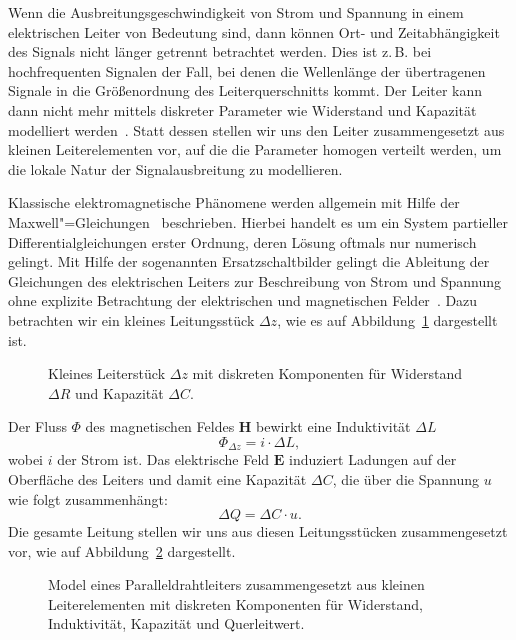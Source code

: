 \documentclass[paper=a4, parskip=half-, ngerman, fontsize=11pt]{scrreprt}
\begin{document}
Wenn die Ausbreitungsgeschwindigkeit von Strom und Spannung in einem elektrischen Leiter von Bedeutung sind, dann
können Ort- und Zeitabhängigkeit des Signals nicht länger getrennt betrachtet werden. Dies ist z.\,B. bei
hochfrequenten Signalen der Fall, bei denen die Wellenlänge der übertragenen Signale in die Größenordnung des
Leiterquerschnitts kommt. Der Leiter kann dann nicht mehr mittels diskreter Parameter wie Widerstand und Kapazität
modelliert werden~\cite{LeiterTheorie}. Statt dessen stellen wir uns den Leiter zusammengesetzt aus kleinen
Leiterelementen vor, auf die die Parameter homogen verteilt werden, um die lokale Natur der Signalausbreitung zu
modellieren.

Klassische elektromagnetische Phänomene werden allgemein mit Hilfe der Maxwell"=Gleichungen~\cite{MaxwellGleichungen}
beschrieben. Hierbei handelt es um ein System partieller Differentialgleichungen erster Ordnung, deren Lösung oftmals
nur numerisch gelingt. Mit Hilfe der sogenannten Ersatzschaltbilder gelingt die Ableitung der Gleichungen des
elektrischen Leiters zur Beschreibung von Strom und Spannung ohne explizite Betrachtung der elektrischen und
magnetischen Felder~\cite{LeitungenUndFilter}. Dazu betrachten wir ein kleines Leitungsstück $\Delta z$, wie es auf
Abbildung~\ref{Leitung1} dargestellt ist.
\begin{figure}[!htb]
    \begin{center}
        
        \caption{Kleines Leiterstück $\Delta z$ mit diskreten Komponenten für Widerstand $\Delta R$ und
        Kapazität $\Delta C$.}
        \label{Leitung1}
    \end{center}
\end{figure}

Der Fluss $\Phi$ des magnetischen Feldes $\textbf{H}$ bewirkt eine Induktivität $\Delta L$
\[ \Phi_{\Delta z} = i \cdot \Delta L, \] wobei $i$ der Strom ist.
Das elektrische Feld $\textbf{E}$ induziert Ladungen auf der Oberfläche des Leiters und damit eine Kapazität $\Delta C$,
die über die Spannung $u$ wie folgt zusammenhängt:
\[ \Delta Q = \Delta C \cdot u . \]
Die gesamte Leitung stellen wir uns aus diesen Leitungsstücken zusammengesetzt vor, wie auf Abbildung~\ref{Leitung2}
dargestellt.
\begin{figure}[!htb]
    \begin{center}
        
        \caption{Model eines Paralleldrahtleiters zusammengesetzt aus kleinen Leiterelementen mit diskreten
        Komponenten für Widerstand, Induktivität, Kapazität und Querleitwert.}
        \label{Leitung2}
    \end{center}
\end{figure}
\end{document}
